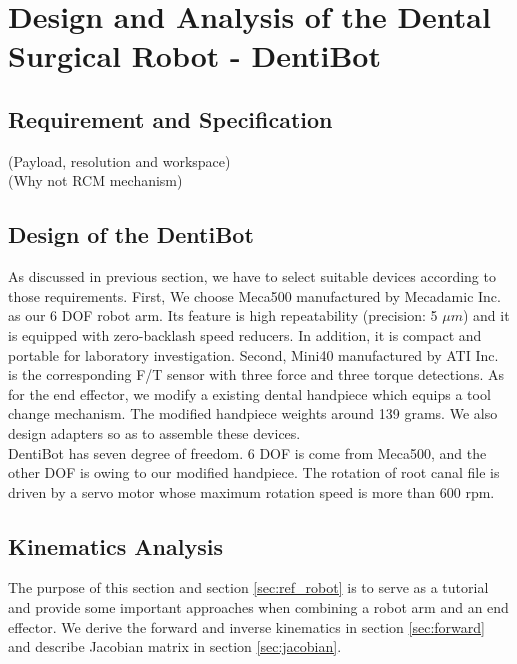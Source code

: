 \chapter{Design and Analysis of the Dental Surgical Robot - DentiBot}
\section{Requirement and Specification}
(Payload, resolution and workspace)														\\
(Why not RCM mechanism)																	
\section{Design of the DentiBot}
As discussed in previous section, we have to select suitable devices according to those requirements. First, We choose Meca500 manufactured by Mecadamic Inc. as our 6 DOF robot arm. Its feature is high repeatability (precision: 5 $\mu m$) and it is equipped with zero-backlash speed reducers. In addition, it is compact and portable for laboratory investigation. Second, Mini40 manufactured by ATI Inc. is the corresponding F/T sensor with three force and three torque detections. As for the end effector, we modify a existing dental handpiece which equips a tool change mechanism. The modified handpiece weights around 139 grams. We also design  adapters so as to assemble these devices.\\
DentiBot has seven degree of freedom. 6 DOF is come from Meca500, and the other DOF is owing to our modified handpiece. The rotation of root canal file is driven by a servo motor whose maximum rotation speed is more than 600 rpm.																		
\section{Kinematics Analysis}
\label{sec:kinematics}
The purpose of this section and section \ref{sec:ref_robot} is to serve as a tutorial and provide some important approaches when combining a robot arm and an end effector. We derive the forward and inverse kinematics in section \ref{sec:forward} and describe Jacobian matrix in section \ref{sec:jacobian}. 
